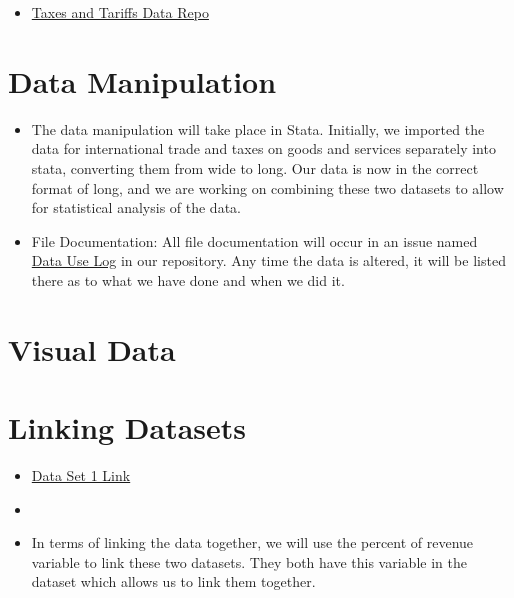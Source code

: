 \documentclass[12pt]{article}
\begin{document}
\noindent
\begin{itemize}

    \item \href{https://github.com/ecn310/course-project-taxes-tariffs/issues/6}{Taxes and Tariffs Data Repo}
\end{itemize}


\section{Data Manipulation}
\label{sec:data}

\begin{itemize}
    \item The data manipulation will take place in Stata. Initially, we imported the data for international trade and taxes on goods and services separately into stata, converting them from wide to long. Our data is now in the correct format of long, and we are working on combining these two datasets to allow for statistical analysis of the data.
    \item File Documentation: All file documentation will occur in an issue named \href{https://github.com/ecn310/course-project-taxes-tariffs/issues/6}{Data Use Log} in our repository. Any time the data is altered, it will be listed there as to what we have done and when we did it.
\end{itemize}

\section{Visual Data}
\label{sec:graphs}

\section{Linking Datasets}
\label{sec:discussion}

\begin{itemize}
    \item \href{https://wits.worldbank.org/CountryProfile/en/Country/BY-COUNTRY/StartYear/1988/EndYear/2022/Indicator/GC-TAX-INTT-RV-ZS}{Data Set 1 Link}

 \item \href{https://wits.worldbank.org/CountryProfile/en/country/by-country/startyear/LTST/endyear/LTST/indicator/GC-TAX-GSRV-RV-ZS}{}
 \item In terms of linking the data together, we will use the percent of revenue variable to link these two datasets. They both have this variable in the dataset which allows us to link them together. 
\end{itemize}
\end{document}
